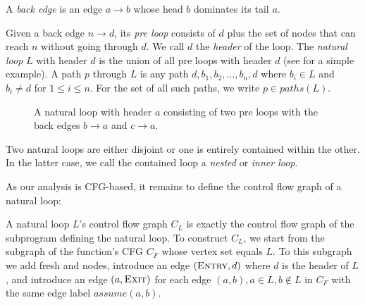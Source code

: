 \begin{definition}
    A \emph{back edge} is an edge $a \rightarrow b$ whose head $b$ dominates its tail $a$.
\end{definition}

\begin{definition}
Given a back edge $n \rightarrow d$, its \emph{pre loop} consists of $d$ plus the set of nodes that can reach $n$ without going through $d$. We call $d$ the \emph{header} of the loop. The \emph{natural loop} $L$ with header $d$ is the union of all pre loops with header $d$ (see  for a simple example). A path $p$ through $L$ is any path $d, b_1, b_2, \dots, b_n, d$ where $b_i \in L$ and $b_i \ne d$ for $1 \le i \le n$. For the set of all such paths, we write $p \in paths(L)$.
\end{definition}

\begin{figure}
\caption{A natural loop with header $a$ consisting of two pre loops with the back edges $b \rightarrow a$ and $c \rightarrow a$.}
\label{fig:same_header}
\end{figure}

\begin{definition}
Two natural loops are either disjoint or one is entirely contained within the other. In the latter case, we call the contained loop a \emph{nested} or \emph{inner loop}.
\end{definition}

As our analysis is CFG-based, it remains to define the control flow graph of a natural loop:

\begin{definition}
A natural loop $L$'s control flow graph $C_L$ is exactly the control flow graph of the subprogram defining the natural loop. To construct $C_L$, we start from the subgraph of the function's CFG $C_F$ whose vertex set equals $L$. To this subgraph we add fresh \entry{} and \exit{} nodes, introduce an edge $(\textsc{Entry}, d)$ where $d$ is the header of $L$, and introduce an edge $(a, \textsc{Exit})$ for each edge $(a, b), a \in L, b \not\in L$ in $C_F$ with the same edge label $assume(a, b)$.
\label{def:nlcfg}
\end{definition}

